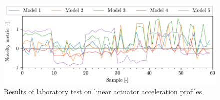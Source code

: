 \begin{figure}
    \includegraphics[width=\linewidth]{images/linear.pdf}
    \caption{Results of laboratory test on linear actuator acceleration profiles}
    \label{fig:linear}
\end{figure}